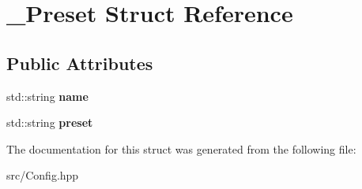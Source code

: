 \hypertarget{struct__Preset}{}\section{\+\_\+\+Preset Struct Reference}
\label{struct__Preset}
\subsection*{Public Attributes}
\begin{DoxyCompactItemize}
\item 
\mbox{\label{struct__Preset_a920f215d6c7272ff41433aad5dd5a9fc}} 
std\+::string {\bfseries name}
\item 
\mbox{\label{struct__Preset_af970f547f46f5f0c09900d155fef11ba}} 
std\+::string {\bfseries preset}
\end{DoxyCompactItemize}


The documentation for this struct was generated from the following file\+:\begin{DoxyCompactItemize}
\item 
src/Config.\+hpp\end{DoxyCompactItemize}
